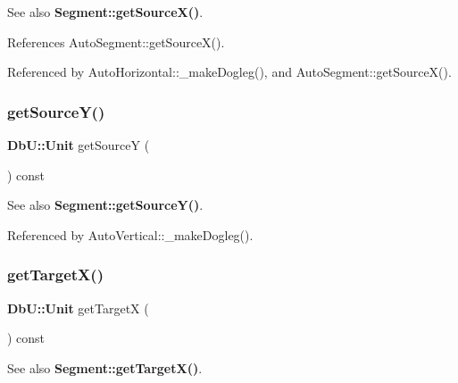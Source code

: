 \begin{DoxySeeAlso}{See also}
\textbf{ Segment\+::get\+Source\+X()}. 
\end{DoxySeeAlso}


References Auto\+Segment\+::get\+Source\+X().



Referenced by Auto\+Horizontal\+::\+\_\+make\+Dogleg(), and Auto\+Segment\+::get\+Source\+X().

\mbox{\label{classKatabatic_1_1AutoSegment_ae913463a76d08b079611a993cebea1a9}} 
\subsubsection{\texorpdfstring{get\+Source\+Y()}{getSourceY()}}
{\footnotesize\ttfamily \textbf{ Db\+U\+::\+Unit} get\+SourceY (\begin{DoxyParamCaption}{ }\end{DoxyParamCaption}) const\hspace{0.3cm}{\ttfamily [inline]}}

\begin{DoxySeeAlso}{See also}
\textbf{ Segment\+::get\+Source\+Y()}. 
\end{DoxySeeAlso}


Referenced by Auto\+Vertical\+::\+\_\+make\+Dogleg().

\mbox{\label{classKatabatic_1_1AutoSegment_a8e6462b43ca9eaeea1e08866cec59a8c}} 
\subsubsection{\texorpdfstring{get\+Target\+X()}{getTargetX()}}
{\footnotesize\ttfamily \textbf{ Db\+U\+::\+Unit} get\+TargetX (\begin{DoxyParamCaption}{ }\end{DoxyParamCaption}) const\hspace{0.3cm}{\ttfamily [inline]}}

\begin{DoxySeeAlso}{See also}
\textbf{ Segment\+::get\+Target\+X()}. 
\end{DoxySeeAlso}


